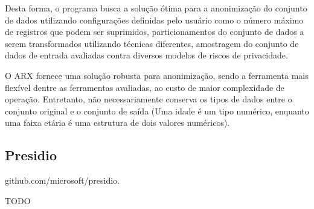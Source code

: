 Desta forma, o programa busca a solução ótima para a anonimização do conjunto de dados utilizando configurações definidas pelo usuário como o número máximo de registros que podem ser suprimidos, particionamentos do conjunto de dados a serem transformados utilizando técnicas diferentes, amostragem do conjunto de dados de entrada avaliadas contra diversos modelos de riscos de privacidade.

O ARX fornece uma solução robusta para anonimização, sendo a ferramenta mais flexível dentre as ferramentas avaliadas, ao custo de maior complexidade de operação. Entretanto, não necessariamente conserva os tipos de dados entre o conjunto original e o conjunto de saída (Uma idade é um tipo numérico, enquanto uma faixa etária é uma estrutura de dois valores numéricos).

\subsection{Presidio}

github.com/microsoft/presidio.

TODO